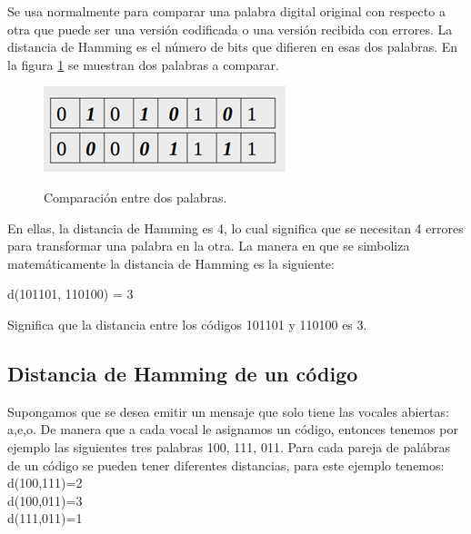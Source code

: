 Se usa normalmente para comparar una palabra digital original con respecto a otra que puede ser una versión codificada o una versión recibida con errores. La distancia de Hamming es el número de bits que difieren en esas dos palabras. En la figura \ref{fig:Unos-ceros} se muestran dos palabras a comparar.

\begin{figure}[h!]
	\captionsetup{justification = raggedright, singlelinecheck = false}
	\caption{Comparación entre dos palabras.} 
	\centering
	\includegraphics[scale=1]{Imagenes/Unos-ceros.png}
	\label{fig:Unos-ceros}
\end{figure}

En ellas, la distancia de Hamming es 4, lo cual significa que se necesitan 4 errores para transformar una palabra en la otra. La manera en que se simboliza matemáticamente la distancia de Hamming es la siguiente: \\

\begin{center}
    d(101101, 110100) = 3
\end{center}

Significa que la distancia entre los códigos 101101 y 110100 es 3.\\

\subsection{Distancia de Hamming de un código}

Supongamos que se desea emitir un mensaje que solo tiene las vocales abiertas: a,e,o. De manera que a cada vocal le asignamos un código, entonces tenemos por ejemplo las siguientes tres palabras {100, 111, 011}. Para cada pareja de palábras de un código se pueden tener diferentes distancias, para este ejemplo tenemos:\\

d(100,111)=2 \\

d(100,011)=3 \\

d(111,011)=1 \\

